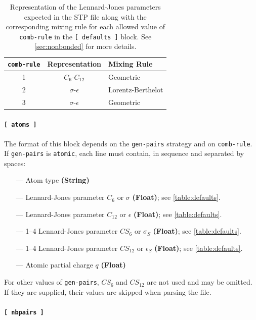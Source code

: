 \documentclass[10pt,a4paper,openany]{memoir}
\numberwithin{equation}{section}
\begin{document}
\begin{table}[tb]
  \caption{Representation of the Lennard-Jones parameters expected in
    the STP file along with the corresponding mixing rule for each
    allowed value of \texttt{comb-rule} in the \texttt{[~defaults~]}
    block. See \autoref{sec:nonbonded} for more details.}
  \label{table:defaults}
  \hspace{1ex}\par
  \centering
  \begin{tabular}{ccl}
    \toprule
    \texttt{comb-rule} & Representation & Mixing Rule \\ \midrule
    1 & $C_6$-$C_{12}$ & Geometric \\
    2 & $\sigma$-$\epsilon$ & Lorentz-Berthelot \\
    3 & $\sigma$-$\epsilon$ & Geometric \\
    \bottomrule
  \end{tabular}
\end{table}

\paragraph{\texttt{[~atoms~]}}

The format of this block depends on the \texttt{gen-pairs} strategy and on \texttt{comb-rule}.
If \texttt{gen-pairs} is \texttt{atomic}, each line must contain, in sequence and separated by spaces:
\begin{itemize}
\item[---] Atom type \textbf{(String)}
\item[---] Lennard-Jones parameter $C_6$ or $\sigma$ \textbf{(Float)}; see \autoref{table:defaults}.
\item[---] Lennard-Jones parameter $C_{12}$ or $\epsilon$ \textbf{(Float)}; see \autoref{table:defaults}.
\item[---] 1--4 Lennard-Jones parameter $CS_6$ or $\sigma_S$ \textbf{(Float)}; see \autoref{table:defaults}.
\item[---] 1--4 Lennard-Jones parameter $CS_{12}$ or $\epsilon_S$ \textbf{(Float)}; see \autoref{table:defaults}.
\item[---] Atomic partial charge $q$ \textbf{(Float)}
\end{itemize}
For other values of \texttt{gen-pairs}, $CS_6$ and $CS_{12}$ are not used and may be omitted.
If they are supplied, their values are skipped when parsing the file.


\paragraph{\texttt{[~nbpairs~]}}
\end{document}
